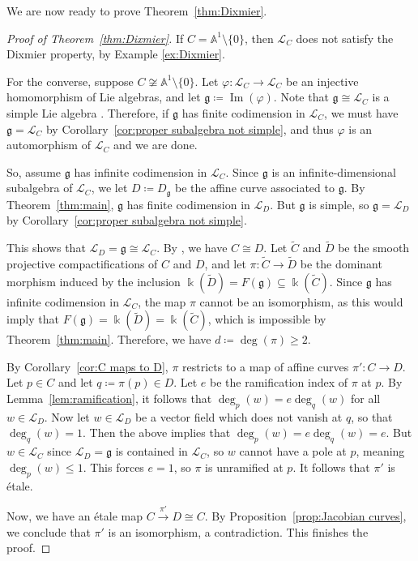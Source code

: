 \documentclass[12pt]{amsart}
\theoremstyle{plain}
\theoremstyle{definition}
\numberwithin{equation}{section}
\def\g{\mathfrak{g}}
\def\L{\mathcal{L}}
\def\Aa{\mathbb{A}}
\def\kk{\Bbbk}
\DeclareMathOperator{\im}{Im}
\def\nonzero{\setminus \{0\}}
\begin{document}
We are now ready to prove Theorem~\ref{thm:Dixmier}.

\begin{proof}[Proof of Theorem~\ref{thm:Dixmier}]
    If $C = \Aa^1 \nonzero$, then $\L_C$ does not satisfy the Dixmier property, by Example \ref{ex:Dixmier}.
    
    For the converse, suppose $C \not\cong \Aa^1 \nonzero$. Let $\varphi \colon \L_C \to \L_C$ be an injective homomorphism of Lie algebras, and let $\g \coloneqq \im(\varphi)$. Note that $\g \cong \L_C$ is a simple Lie algebra \cite[Proposition 1]{Siebert}. Therefore, if $\g$ has finite codimension in $\L_C$, we must have $\g = \L_C$ by Corollary~\ref{cor:proper subalgebra not simple}, and thus $\varphi$ is an automorphism of $\L_C$ and we are done.

    So, assume $\g$ has infinite codimension in $\L_C$. Since $\g$ is an infinite-dimensional subalgebra of $\L_C$, we let $D \coloneqq D_\g$ be the affine curve associated to $\g$. By Theorem~\ref{thm:main}, $\g$ has finite codimension in $\L_D$. But $\g$ is simple, so $\g = \L_D$ by Corollary~\ref{cor:proper subalgebra not simple}.

    This shows that $\L_D = \g \cong \L_C$. By \cite[Corollary 3]{Siebert}, we have $C \cong D$. Let $\widetilde{C}$ and $\widetilde{D}$ be the smooth projective compactifications of $C$ and $D$, and let $\pi \colon \widetilde{C} \to \widetilde{D}$ be the dominant morphism induced by the inclusion $\kk(\widetilde{D}) = F(\g) \subseteq \kk(\widetilde{C})$. Since $\g$ has infinite codimension in $\L_C$, the map $\pi$ cannot be an isomorphism, as this would imply that $F(\g) = \kk(\widetilde{D}) = \kk(\widetilde{C})$, which is impossible by Theorem~\ref{thm:main}. Therefore, we have $d \coloneqq \deg(\pi) \geq 2$.

    By Corollary~\ref{cor:C maps to D}, $\pi$ restricts to a map of affine curves $\pi' \colon C \to D$. Let $p \in C$ and let $q \coloneqq \pi(p) \in D$. Let $e$ be the ramification index of $\pi$ at $p$. By Lemma~\ref{lem:ramification}, it follows that $\deg_p(w) = e \deg_q(w)$ for all $w \in \L_D$. Now let $w \in \L_D$ be a vector field which does not vanish at $q$, so that $\deg_q(w) = 1$. Then the above implies that $\deg_p(w) = e \deg_q(w) = e$. But $w \in \L_C$ since $\L_D = \g$ is contained in $\L_C$, so $w$ cannot have a pole at $p$, meaning $\deg_p(w) \leq 1$. This forces $e = 1$, so $\pi$ is unramified at $p$. It follows that $\pi'$ is \'etale.

    Now, we have an \'etale map $C \xrightarrow{\pi'} D \cong C$. By Proposition~\ref{prop:Jacobian curves}, we conclude that $\pi'$ is an isomorphism, a contradiction. This finishes the proof.
\end{proof}
\end{document}
